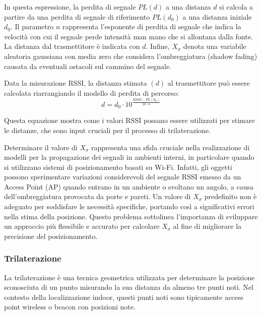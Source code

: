 \noindent In questa espressione, la perdita di segnale $PL(d)$ a una distanza $d$ si calcola a partire da una perdita di segnale di riferimento $PL(d_0)$ a una distanza iniziale $d_0$. Il parametro $n$ rappresenta l'esponente di perdita di segnale che indica la velocità con cui il segnale perde intensità man mano che si allontana dalla fonte. La distanza dal trasmettitore è indicata con $d$. Infine, $X_{\sigma}$ denota una variabile aleatoria gaussiana con media zero che considera l'ombreggiatura (shadow fading) causata da eventuali ostacoli sul cammino del segnale.

\pagebreak

\noindent Data la misurazione RSSI, la distanza stimata $(d)$ al trasmettitore può essere calcolata riarrangiando il modello di perdita di percorso:
\begin{equation}
    \displaystyle{d = d_0 \cdot 10^{\frac{RSSI - PL(d_0)}{10 \cdot n}}}
\end{equation}

\noindent Questa equazione mostra come i valori RSSI possano essere utilizzati per stimare le distanze, che sono input cruciali per il processo di trilaterazione.

Determinare il valore di $X_{\sigma}$ rappresenta una sfida cruciale nella realizzazione di modelli per la propagazione dei segnali in ambienti interni, in particolare quando si utilizzano sistemi di posizionamento basati su Wi-Fi. Infatti, gli oggetti possono sperimentare variazioni considerevoli del segnale RSSI emesso da un Access Point (AP) quando entrano in un ambiente o svoltano un angolo, a causa dell'ombreggiatura provocata da porte e pareti. Un valore di $X_{\sigma}$ predefinito non è adeguato per soddisfare le necessità specifiche, portando così a significativi errori nella stima della posizione. Questo problema sottolinea l'importanza di sviluppare un approccio più flessibile e accurato per calcolare $X_{\sigma}$ al fine di migliorare la precisione del posizionamento.

\subsubsection{Trilaterazione}
\hspace{\parindent}La trilaterazione è una tecnica geometrica utilizzata per determinare la posizione sconosciuta di un punto misurando la sua distanza da almeno tre punti noti. Nel contesto della localizzazione indoor, questi punti noti sono tipicamente access point wireless o beacon con posizioni note.

